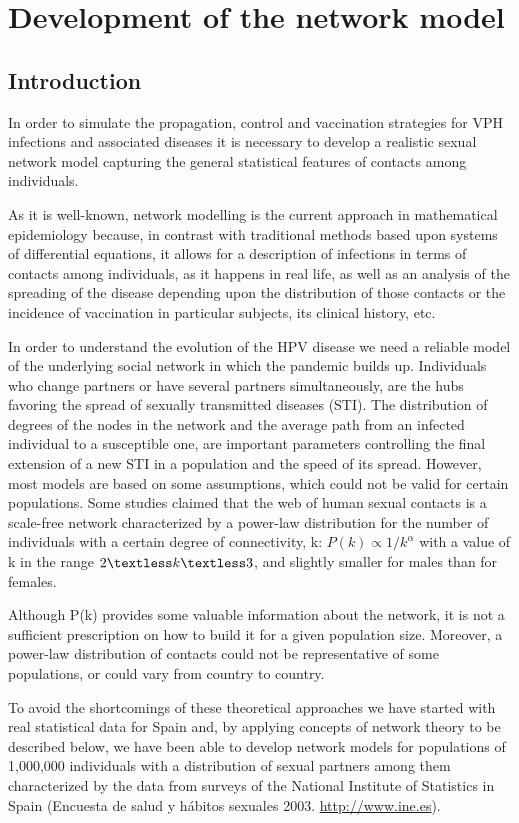 
\chapter{Development of the network model}\label{paper1}

\section{Introduction}
In order to simulate the propagation, control and vaccination strategies for VPH infections and associated diseases it is necessary to develop a realistic sexual network model capturing the general statistical features of contacts among individuals.

As it is well-known, network modelling is the current approach in mathematical epidemiology because, in contrast with traditional methods based upon systems of differential equations, it allows for a description of infections in terms of contacts among individuals, as it happens in real life, as well as an analysis of the spreading of the disease depending upon the distribution of those contacts or the incidence of vaccination in particular subjects, its clinical history, etc.

In order to understand the evolution of the HPV disease we need a reliable model of the underlying social network in which the pandemic builds up. Individuals who change partners or have several partners simultaneously, are the hubs favoring the spread of sexually transmitted diseases (STI). The distribution of degrees of the nodes in the network and the average path from an infected individual to a susceptible one, are important parameters controlling the final extension of a new STI in a population and the speed of its spread. However, most models are based on some assumptions, which could not be valid for certain populations. Some studies claimed that the web of human sexual contacts is a scale-free network characterized by a power-law distribution for the number of individuals with a certain degree of connectivity, k: $P(k)\propto1/k^\alpha$  with a value of k in the range $2 \textless k \textless 3$, and slightly smaller for males than for females.

Although P(k) provides some valuable information about the network, it is not a sufficient prescription on how to build it for a given population size.
Moreover, a power-law distribution of contacts could not be representative of some populations, or could vary from country to country.

To avoid the shortcomings of these theoretical approaches we have started with real statistical data for Spain and, by applying concepts of network theory to be described below, we have been able to develop network models for populations of 1,000,000 individuals with a distribution of sexual partners among them characterized by the data from surveys of the National Institute of Statistics in Spain (Encuesta de salud y h\'abitos sexuales 2003. \url{http://www.ine.es}).

